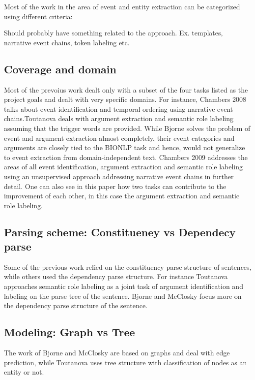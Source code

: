 Most of the work in the area of event and entity extraction can be categorized using different criteria:

Should probably have something related to the approach. Ex. templates, narrative event chains, token labeling etc.

\subsection {Coverage and domain} 
Most of the prevoius work dealt only with a subset of the four tasks listed as the project goals and dealt with very specific domains. For instance, Chambers 2008 talks about event identification and temporal ordering using narrative event chains.Toutanova deals with argument extraction and semantic role labeling assuming that the trigger words are provided. While Bjorne solves the problem of event and argument extraction almost completely, their event categories and arguments are closely tied to the BIONLP task and hence, would not generalize to event extraction from domain-independent text. Chambers 2009 addresses the areas of all event identification, argument extraction and semantic role labeling using an unsupervised approach addressing narrative event chains in further detail. One can also see in this paper how two tasks can contribute to the improvement of each other, in this case the argument extraction and semantic role labeling.

\subsection {Parsing scheme: Constitueney vs Dependecy parse}
Some of the previous work relied on the constituency parse structure of sentences, while others used the dependency parse structure. For instance Toutanova approaches semantic role labeling as a joint task of argument identification and labeling on the parse tree of the sentence. Bjorne and McClosky focus more on the dependency parse structure of the sentence.

\subsection {Modeling: Graph vs Tree} 
The work of Bjorne and McClosky are based on graphs and deal with edge prediction, while Toutanova uses tree structure with classification of nodes as an entity or not.
